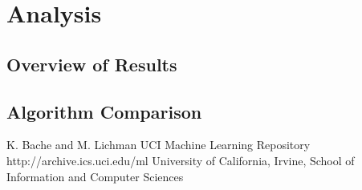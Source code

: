 \documentclass{sig-alternate}
\begin{document}
\section{Analysis}

\subsection{Overview of Results}

\subsection{Algorithm Comparison}





\begin{thebibliography}{10}

K. Bache and M. Lichman
\newblock UCI Machine Learning Repository
\newblock http://archive.ics.uci.edu/ml
\newblock University of California, Irvine, School of Information and Computer Sciences


\end{thebibliography}
\end{document}
